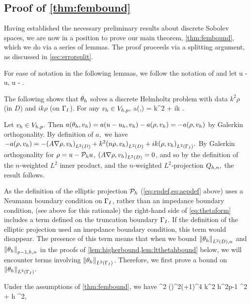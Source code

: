 \subsection{Proof of \cref{thm:fembound}}\label{sec:fembound}

Having established the necessary preliminary results about discrete Sobolev spaces, we are now in a position to prove our main theorem, \cref{thm:fembound}, which we do via a series of lemmas. The proof proceeds via a splitting argument, as discussed in \cref{sec:errorsplit}.

For ease of notation in the following lemmas, we follow the notation of \cite{DuWu:15} and let 
\beqs
\rho \de u - \Ph u, \tand
\eeqs
\beqs
\thetah \de \Ph u - \uh.
\eeqs


The following  shows that $\theta_{h}$ solves a discrete Helmholtz problem with data $k^2 \rho$ (in $D$) and $ik \rho$ (on $\Gamma_{I}$).
\label{lem:simpleform}
For any $v_{h} \in V_{h,p},$
\beq\label{eq:thetaform}
a(\thetah,\vh) = k^2\IPLtDn{\Qhn\rho}{\vh} + ik \IPLtGI{\rho}{\vh}.
\eeq
\ele

Let $v_{h} \in V_{h,p}.$ Then $a(\theta_{h},v_{h}) = a(u-u_{h},v_{h}) - a(\rho,v_{h}) = -a(\rho,v_{h})$ by Galerkin orthogonality. By definition of $a,$ we have $-a(\rho,\vh) = -\IPLtD{A\grad\rho}{\vh} + k^2 \IPLtD{n\rho}{\vh} + ik\IPLtGI{\rho}{\vh}.$ By Galerkin orthogonality for $\rho = u - \mathcal P_{h} u$, $\IPLtD{A\grad\rho}{\vh} = 0$, and so by the definition of the $n$-weighted $L^2$ inner product, and the $n$-weighted $L^2$-projection $Q_{h,n},$ the result follows.
\epf

As the definition of the elliptic projection $\mathcal P_{h}$ (\cref{eq:epdef,eq:aepdef} above) uses a Neumann boundary condition on $\Gamma_{I}$, rather than an impedance boundary condition, (see above for this rationale) the right-hand side of \cref{eq:thetaform} includes a term defined on the truncation boundary $\Gamma_{I}.$ If the definition of the elliptic projection used an imepdance boundary condition, this term would disappear. The presence of this term means that when we bound $\NLtDn{\thetah}$ and $\Npmohn{\thetah}$ in the proofs of \cref{lem:higherbound,lem:ltthetahbound} below, we will encounter terms involving $\NLtGI{\thetah}$. Therefore, we first prove a bound on $\NLtGI{\thetah}.$

\label{lem:boundarybound}
Under the assumptions of \cref{thm:fembound}, we have
\beq\label{eq:boundarybound}
\NLtGI{\thetah}^2 \leq \Cboundaryo \mleft(\En\nvar\mright)^{2\mleft(+1\mright)}^4 k^2 h^{2p-1} ^2 + \Cboundaryt h \NW{\rho}^2,
\eeq
\ele

